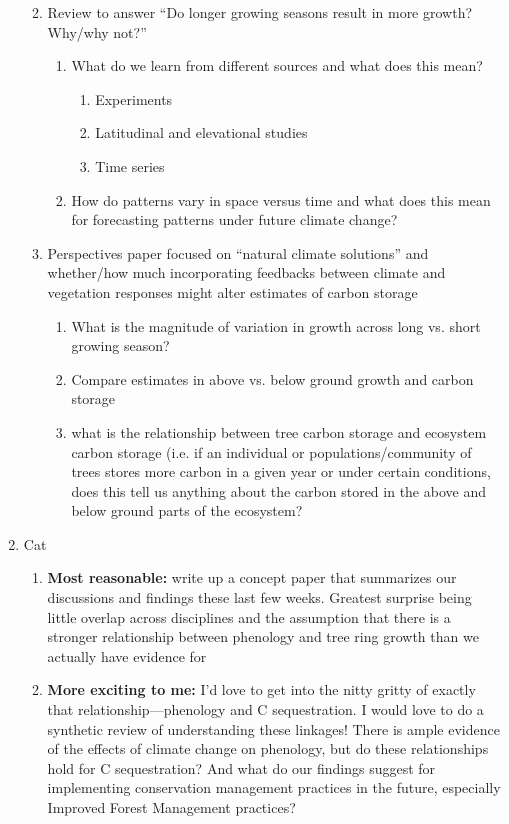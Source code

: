 \documentclass[11pt,letter]{article}
\begin{document}
\begin{enumerate}
\begin{enumerate}
\begin{enumerate}
\end{enumerate}
\item  Review to answer “Do longer growing seasons result in more growth? Why/why not?”
\begin{enumerate}
\item What do we learn from different sources and what does this mean?
\begin{enumerate}
\item Experiments
\item Latitudinal and elevational studies
\item Time series
\end{enumerate}
\item How do patterns vary in space versus time and what does this mean for forecasting patterns under future climate change?
\end{enumerate}
\item Perspectives paper focused on “natural climate solutions” and whether/how much incorporating feedbacks between climate and vegetation responses might alter estimates of carbon storage
\begin{enumerate}
\item What is the magnitude of variation in growth across long vs. short growing season?
\item Compare estimates in above vs. below ground growth and carbon storage
\item    what is the relationship between tree carbon storage and ecosystem carbon storage (i.e. if an individual or populations/community of trees stores more carbon in a given year or under certain conditions, does this tell us anything about the carbon stored in the above and below ground parts of the ecosystem?
\end{enumerate}
\end{enumerate}
 \item Cat           
\begin{enumerate}
\item {\bf Most reasonable:} write up a concept paper that summarizes our discussions and findings these last few weeks. Greatest surprise being little overlap across disciplines and the assumption that there is a stronger relationship between phenology and tree ring growth than we actually have evidence for
\item {\bf More exciting to me:} I'd love to get into the nitty gritty of exactly that relationship---phenology and C sequestration. I would love to do a synthetic review of understanding these linkages! There is ample evidence of the effects of climate change on phenology, but do these relationships hold for C sequestration? And what do our findings suggest for implementing conservation management practices in the future, especially Improved Forest Management practices?
\end{enumerate}
\end{enumerate}
\end{document}
